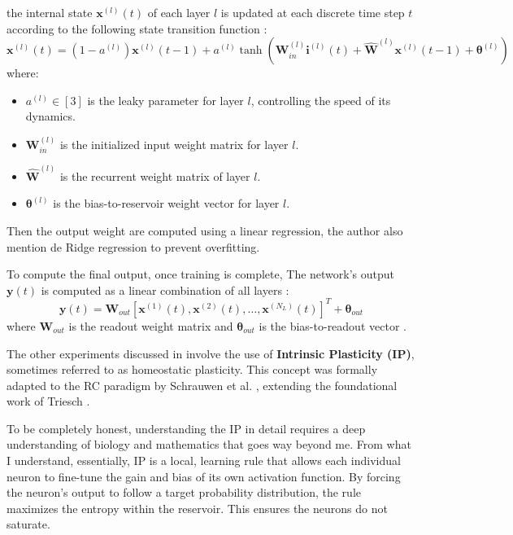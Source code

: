 the internal state $\mathbf{x}^{(l)}(t)$ of each layer $l$ is updated at each discrete time step $t$ according to the following state transition function \cite{Gallicchio2017}:
\begin{equation}
    \mathbf{x}^{(l)}(t) = (1 - a^{(l)}) \mathbf{x}^{(l)}(t - 1) + a^{(l)} \tanh \left( \mathbf{W}_{in}^{(l)} \mathbf{i}^{(l)}(t) + \mathbf{\hat{W}}^{(l)} \mathbf{x}^{(l)}(t - 1) + \boldsymbol{\theta}^{(l)} \right)
\end{equation}
where:
\begin{itemize}
    \item $a^{(l)} \in [3]$ is the leaky parameter for layer $l$, controlling the speed of its dynamics.
    \item $\mathbf{W}_{in}^{(l)}$ is the initialized input weight matrix for layer $l$.
    \item $\mathbf{\hat{W}}^{(l)}$ is the recurrent weight matrix of layer $l$.
    \item $\boldsymbol{\theta}^{(l)}$ is the bias-to-reservoir weight vector for layer $l$.
\end{itemize}

Then the output weight are computed using a linear regression, the author also mention de Ridge regression to prevent overfitting.

To compute the final output, once training is complete, The network's output $\mathbf{y}(t)$ is computed as a linear combination of all layers \cite{Gallicchio2017}:
\begin{equation}
    \mathbf{y}(t) = \mathbf{W}_{out} [\mathbf{x}^{(1)}(t), \mathbf{x}^{(2)}(t), \dots, \mathbf{x}^{(N_L)}(t)]^T + \boldsymbol{\theta}_{out}
\end{equation}
where $\mathbf{W}_{out}$ is the readout weight matrix and $\boldsymbol{\theta}_{out}$ is the bias-to-readout vector \cite{Gallicchio2017}.


\vspace{0.5cm}

The other experiments discussed in \cite{Gallicchio2017} involve the use of \textbf{Intrinsic Plasticity (IP)}, sometimes referred to as homeostatic plasticity. This concept was formally adapted to the RC paradigm by Schrauwen et al. \cite{schrauwen2008improving}, extending the foundational work of Triesch \cite{triesch2005gradient}.

\vspace{0.5cm}

To be completely honest, understanding the IP in detail requires a deep understanding of biology and mathematics that goes way beyond me. From what I understand, essentially, IP is a local, learning rule that allows each individual neuron to fine-tune the gain and bias of its own activation function. By forcing the neuron's output to follow a target probability distribution, the rule maximizes the entropy within the reservoir. This ensures the neurons do not saturate.

